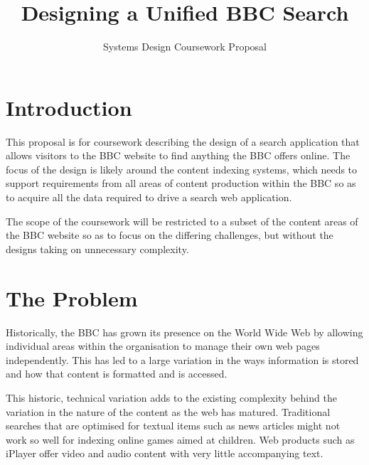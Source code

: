 \documentclass{article}
\title{Designing a Unified BBC Search}
\subtitle{Systems Design Coursework Proposal}
\begin{document}
\maketitle

\section{Introduction}

This proposal is for coursework describing the design of a search application
that allows visitors to the BBC website to find anything the BBC offers
online. The focus of the design is likely around the content indexing
systems, which needs to support requirements from all areas of content
production within the BBC so as to acquire all the data required to drive
a search web application.

The scope of the coursework will be restricted to a subset of the content
areas of the BBC website so as to focus on the differing challenges, but
without the designs taking on unnecessary complexity.

\section{The Problem}

Historically, the BBC has grown its presence on the World Wide Web by
allowing individual areas within the organisation to manage their own web
pages independently. This has led to a large variation in the ways
information is stored and how that content is formatted and is accessed.

This historic, technical variation adds to the existing complexity behind
the variation in the nature of the content as the web has matured. Traditional
searches that are optimised for textual items such as news articles might
not work so well for indexing online games aimed at children. Web products
such as iPlayer offer video and audio content with very little accompanying
text.
\end{document}
